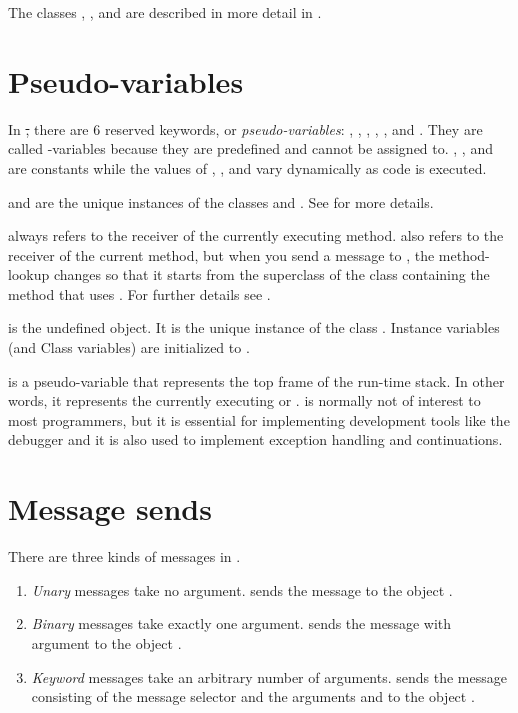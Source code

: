 \documentclass[a4paper,10pt,twoside]{book}
\begin{document}
The classes , ,  and  are described in more detail in .


\section{Pseudo-variables}

In \st, there are 6 reserved keywords, or \emph{pseudo-variables}:
, ,  ,  , , and .
They are called -variables because they are predefined and cannot be assigned to.
, , and  are constants while the values of , , and  vary dynamically as code is executed.

 and  are the unique instances of the  classes  and .
See  for more details.

 always refers to the receiver of the currently executing method.
 also refers to the receiver of the current method, but when you send a message to \super, the method-lookup changes so that it starts from the superclass of the class containing the method that uses .
For further details see .

 is the undefined object.
It is the unique instance of the class . 
Instance variables (and Class variables) are initialized to .

 is a pseudo-variable that represents the top frame of the run-time stack.
In other words, it represents the currently executing  or .
 is normally not of interest to most programmers, but it is essential for implementing development tools like the debugger and it is also used to implement exception handling and continuations.

\section{Message sends}

There are three kinds of messages in \sq.
\begin{enumerate}
  \item \emph{Unary} messages take no argument.
   sends the message  to the object .
  \item \emph{Binary} messages take exactly one argument.
  	 sends the message \ct{+} with argument  to the object .
  \item \emph{Keyword} messages take an arbitrary number of arguments.
  	 sends the message consisting of the message selector
	 and the arguments  and  to the object .
\end{enumerate}
\end{document}

